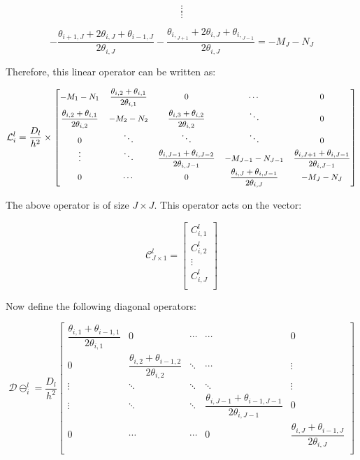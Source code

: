 \documentclass[11pt,a4paper]{article}
\begin{document}
\begin{flushleft}
\begin{landscape}
$$\vdots$$
$$\vdots $$  

$$  -\dfrac{\theta_{i+1,J}+2\theta_{i,J}+\theta_{i-1,J}}{2\theta_{i,J}}-\dfrac{\theta_{{i,}_{J+1}}+2\theta_{i,J}+\theta_{{i,}_{J-1}}}{2\theta_{i,J}} = -M_J - N_J $$

\end{landscape}

Therefore, this linear operator can be written as:

\begin{equation}
\mathcal{L}^l_{i}=\dfrac{D_l}{h^2} \times
\label{eq:oper2}
{\fontsize{0.3cm}{0.1em}  {\begin{bmatrix}
-M_1-N_1 & \dfrac{\theta_{i,2}+\theta_{i,1}}{2\theta_{i,1}}& 0 & \cdots & 0\\
\dfrac{\theta_{i,2}+\theta_{i,1}}{2\theta_{i,2}}  & -M_2-N_2 & \dfrac{\theta_{i,3}+\theta_{i,2}}{2\theta_{i,2}}  & \ddots & 0\\
0 & \ddots & \ddots & \ddots & 0\\
\vdots & \ddots & \dfrac{\theta_{i,J-1}+\theta_{i,J-2}}{2\theta_{i,J-1}}  & -M_{J-1}-N_{J-1}  & \dfrac{\theta_{i,J+1}+\theta_{i,J-1}}{2\theta_{i,J-1}}\\
0 & \cdots & 0 & \dfrac{\theta_{i,J}+\theta_{i,J-1}}{2\theta_{i,J}}  & -M_J-N_J \\
\end{bmatrix}}}
\end{equation}

\bigskip The above operator is of size $J \times J$. This operator acts on the vector:

$$\mathbf{\mathcal{C}}^l_{J \times 1} = \begin{bmatrix}
 C^l_{i,1} \\ C^l_{i,2} \\ \vdots \\ C^l_{i,J} \\
\end{bmatrix}$$

\bigskip Now define the following diagonal operators:

\begin{equation}
\label{eq:diag_i-1}
\mathcal{D} \ominus^l_{i}=\dfrac{D_l}{h^2}
\begin{bmatrix}
\dfrac{\theta_{i,1}+\theta_{i-1,1}}{2\theta_{i,1}} & 0 & \cdots & \cdots & 0 \\
0 & \dfrac{\theta_{i,2}+\theta_{i-1,2}}{2\theta_{i,2}} & \ddots & \cdots & \vdots \\
\vdots & \ddots & \ddots & \ddots &  \vdots   \\
\vdots & \ddots & \ddots & \dfrac{\theta_{i,J-1}+\theta_{i-1,J-1}}{2\theta_{i,J-1}} &  0  \\
0& \cdots & \cdots & 0 &    \dfrac{\theta_{i,J}+\theta_{i-1,J}}{2\theta_{i,J}}\\
\end{bmatrix}
\end{equation}


\end{flushleft}
\end{document}
